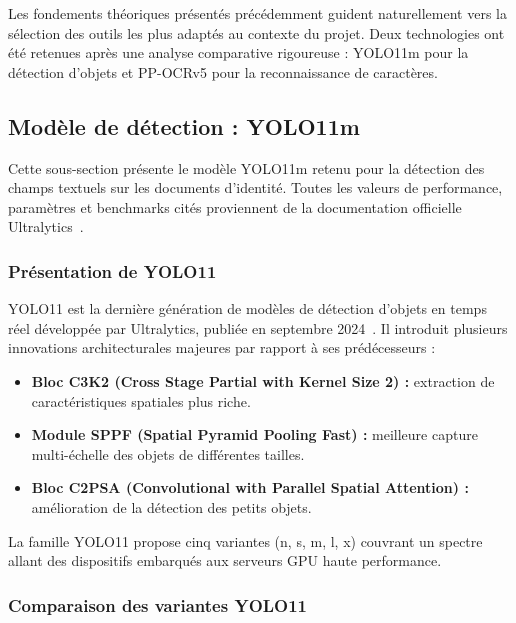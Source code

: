 Les fondements théoriques présentés précédemment guident naturellement vers la sélection des outils les plus adaptés au contexte du projet. Deux technologies ont été retenues après une analyse comparative rigoureuse : YOLO11m pour la détection d'objets et PP-OCRv5 pour la reconnaissance de caractères.

\subsection{Modèle de détection : YOLO11m}
\label{subsec:yolo11m}

Cette sous-section présente le modèle YOLO11m retenu pour la détection des champs textuels sur les documents d'identité. Toutes les valeurs de performance, paramètres et benchmarks cités proviennent de la documentation officielle Ultralytics~\cite{ultralytics_docs}.

\subsubsection{Présentation de YOLO11}

YOLO11 est la dernière génération de modèles de détection d'objets en temps réel développée par Ultralytics, publiée en septembre 2024~\cite{ultralytics_docs}. Il introduit plusieurs innovations architecturales majeures par rapport à ses prédécesseurs :

\begin{itemize}
  \item \textbf{Bloc C3K2 (Cross Stage Partial with Kernel Size 2) :} extraction de caractéristiques spatiales plus riche.

  \item \textbf{Module SPPF (Spatial Pyramid Pooling Fast) :} meilleure capture multi-échelle des objets de différentes tailles.

  \item \textbf{Bloc C2PSA (Convolutional with Parallel Spatial Attention) :} amélioration de la détection des petits objets.
\end{itemize}

La famille YOLO11 propose cinq variantes (n, s, m, l, x) couvrant un spectre allant des dispositifs embarqués aux serveurs GPU haute performance.

\subsubsection{Comparaison des variantes YOLO11}

